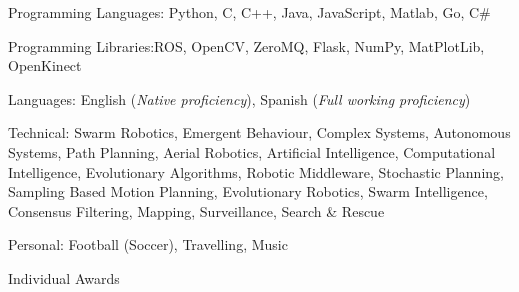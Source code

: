 \documentclass[10pt,a4paper]{article} %
\begin{document}


\inlineheadsection
{Programming Languages:}
{Python, C, C++, Java, JavaScript, Matlab, Go, C\#}

\inlineheadsection
{Programming Libraries:}{ROS, OpenCV, ZeroMQ, Flask, NumPy, MatPlotLib, OpenKinect}

\inlineheadsection
{Languages:}
{English (\emph{Native proficiency}), Spanish (\emph{Full working proficiency})\newline}

\spacedhrule{1.6em}{-0.4em} %

\inlineheadsection
{Technical:}
{Swarm Robotics, Emergent Behaviour, Complex Systems, Autonomous Systems, Path Planning, Aerial Robotics, Artificial Intelligence, Computational Intelligence, Evolutionary Algorithms, Robotic Middleware, Stochastic Planning, Sampling Based Motion Planning, Evolutionary Robotics, Swarm Intelligence, Consensus Filtering, Mapping, Surveillance, Search \& Rescue}

\inlineheadsection
{Personal:}
{Football (Soccer), Travelling, Music}


\headedsection %
{Individual Awards}
{}{}
\end{document}
